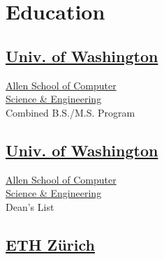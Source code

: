 \documentclass[]{deedy-resume}
\begin{document}
%
%

%
%

%
%

\begin{minipage}[t]{0.33\textwidth} 


\section{Education} 

\subsection{\href{http://www.washington.edu/}{Univ. of Washington}}
\href{https://www.cs.washington.edu/}{Allen School of Computer\\
Science \& Engineering}\\
Combined B.S./M.S. Program
\sectionsep

\subsection{\href{http://www.washington.edu/}{Univ. of Washington}}
\href{https://www.cs.washington.edu/}{Allen School of Computer\\
Science \& Engineering}\\
Dean's List\\
\sectionsep

\subsection{\href{https://www.inf.ethz.ch/}{ETH Z\"urich}}
\sectionsep


\end{minipage}
\end{document}
